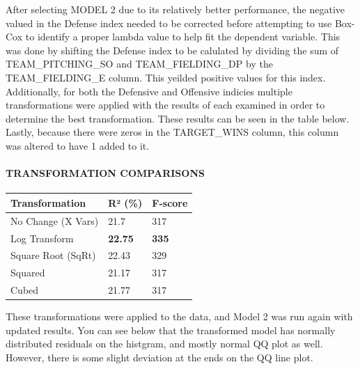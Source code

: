\documentclass[
]{article}
\begin{document}
After selecting MODEL 2 due to its relatively better performance, the
negative valued in the Defense index needed to be corrected before
attempting to use Box-Cox to identify a proper lambda value to help fit
the dependent variable. This was done by shifting the Defense index to
be calulated by dividing the sum of TEAM\_PITCHING\_SO and
TEAM\_FIELDING\_DP by the TEAM\_FIELDING\_E column. This yeilded
positive values for this index. Additionally, for both the Defensive and
Offensive indicies multiple transformations were applied with the
results of each examined in order to determine the best transformation.
These results can be seen in the table below. Lastly, because there were
zeros in the TARGET\_WINS column, this column was altered to have 1
added to it.

\paragraph{TRANSFORMATION COMPARISONS}\label{transformation-comparisons}

\begin{longtable}[]{@{}lll@{}}
\toprule\noalign{}
Transformation & R² (\%) & F-score \\
\midrule\noalign{}
\endhead
\bottomrule\noalign{}
\endlastfoot
No Change (X Vars) & 21.7 & 317 \\
Log Transform & \textbf{22.75} & \textbf{335} \\
Square Root (SqRt) & 22.43 & 329 \\
Squared & 21.17 & 317 \\
Cubed & 21.77 & 317 \\
\end{longtable}

These transformations were applied to the data, and Model 2 was run
again with updated results. You can see below that the transformed model
has normally distributed residuals on the histgram, and mostly normal QQ
plot as well. However, there is some slight deviation at the ends on the
QQ line plot.
\end{document}
